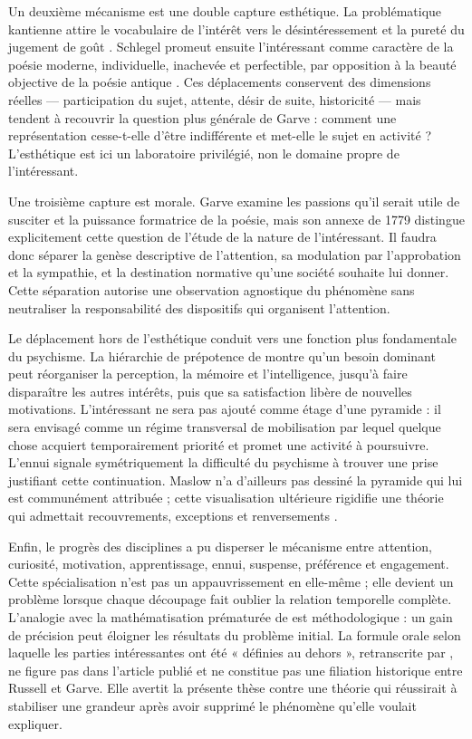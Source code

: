 \documentclass[11pt,a4paper]{article}
\begin{document}
Un deuxième mécanisme est une double capture esthétique. La problématique
kantienne attire le vocabulaire de l'intérêt vers le désintéressement et la
pureté du jugement de goût \parencite{kant1993juger}. Schlegel promeut ensuite
l'intéressant comme caractère de la poésie moderne, individuelle, inachevée et
perfectible, par opposition à la beauté objective de la poésie antique
\parencite{schlegel2001study,nannini2018interesting}. Ces déplacements conservent
des dimensions réelles --- participation du sujet, attente, désir de suite,
historicité --- mais tendent à recouvrir la question plus générale de Garve :
comment une représentation cesse-t-elle d'être indifférente et met-elle le sujet
en activité ? L'esthétique est ici un laboratoire privilégié, non le domaine
propre de l'intéressant.

Une troisième capture est morale. Garve examine les passions qu'il serait utile
de susciter et la puissance formatrice de la poésie, mais son annexe de 1779
distingue explicitement cette question de l'étude de la nature de
l'intéressant. Il faudra donc séparer la genèse descriptive de l'attention, sa
modulation par l'approbation et la sympathie, et la destination normative qu'une
société souhaite lui donner. Cette séparation autorise une observation
agnostique du phénomène sans neutraliser la responsabilité des dispositifs qui
organisent l'attention.

Le déplacement hors de l'esthétique conduit vers une fonction plus fondamentale
du psychisme. La hiérarchie de prépotence de \textcite{maslow1943motivation}
montre qu'un besoin dominant peut réorganiser la perception, la mémoire et
l'intelligence, jusqu'à faire disparaître les autres intérêts, puis que sa
satisfaction libère de nouvelles motivations. L'intéressant ne sera pas ajouté
comme étage d'une pyramide : il sera envisagé comme un régime transversal de
mobilisation par lequel quelque chose acquiert temporairement priorité et promet
une activité à poursuivre. L'ennui signale symétriquement la difficulté du
psychisme à trouver une prise justifiant cette continuation. Maslow n'a d'ailleurs
pas dessiné la pyramide qui lui est communément attribuée ; cette visualisation
ultérieure rigidifie une théorie qui admettait recouvrements, exceptions et
renversements \parencite{bridgman2019maslow}.

Enfin, le progrès des disciplines a pu disperser le mécanisme entre attention,
curiosité, motivation, apprentissage, ennui, suspense, préférence et engagement.
Cette spécialisation n'est pas un appauvrissement en elle-même ; elle devient un
problème lorsque chaque découpage fait oublier la relation temporelle complète.
L'analogie avec la mathématisation prématurée de \textcite{russell1995rationality}
est méthodologique : un gain de précision peut éloigner les résultats du problème
initial. La formule orale selon laquelle les parties intéressantes ont été
« définies au dehors », retranscrite par \textcite{pachet1997representation}, ne
figure pas dans l'article publié et ne constitue pas une filiation historique
entre Russell et Garve. Elle avertit la présente thèse contre une théorie qui
réussirait à stabiliser une grandeur après avoir supprimé le phénomène qu'elle
voulait expliquer.
\end{document}
